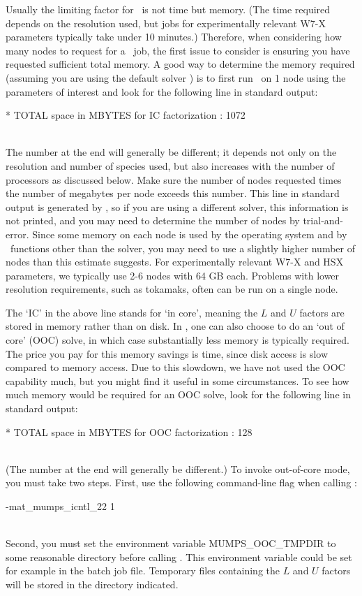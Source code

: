 Usually the limiting factor for \sfincs~is not time but memory.
(The time required depends on the resolution used, but jobs for experimentally relevant W7-X parameters
typically take under 10 minutes.)
Therefore, when considering how many nodes to request for a \sfincs~job,
the first issue to consider is ensuring you have requested sufficient total memory.
A good way to determine the memory required (assuming you are using the default solver \mumps)
is to first run \sfincs~on 1 node using the parameters of interest
and look for the following line in standard output:\\
\centerline{\ttfamily ** TOTAL     space in MBYTES for IC factorization         :       1072}\\
The number at the end will generally be different; it depends not only on the
resolution and number of species used, but also increases with the number of processors
as discussed below.  Make sure the number of nodes requested times the number of megabytes per node exceeds this number.
This line in standard output is generated by \mumps, so if you are using a different solver, this information is not printed,
and you may need to determine the number of nodes by trial-and-error.
Since some memory on each node is used by the operating system and by \sfincs~functions other than the solver,
you may need to use a slightly higher number of nodes than this estimate suggests.
For experimentally relevant W7-X and HSX parameters, we typically use 2-6 nodes with 64 GB each.
Problems with lower resolution requirements, such as tokamaks, often can be run on a single node.

The `IC' in the above line stands for `in core', meaning the $L$ and $U$ factors are stored
in memory rather than on disk.  In \mumps, one can also choose to do an `out of core' (OOC) solve,
in which case substantially less memory is typically required.  The price you pay for this memory savings is time, since
disk access is slow compared to memory access.  Due to this slowdown, we have not used the OOC capability much, but
you might find it useful in some circumstances.
To see how much memory would be required for an OOC solve,
look for the following line in standard output:\\
\centerline{\ttfamily ** TOTAL     space in MBYTES for OOC factorization        :       128}\\
(The number at the end will generally be different.)
To invoke out-of-core mode, you must take two steps. First, use the following command-line flag when calling \sfincs:\\
\centerline{\ttfamily -mat\_mumps\_icntl\_22 1}\\
Second, you must set the environment variable {\ttfamily MUMPS\_OOC\_TMPDIR} to some reasonable directory
before calling \sfincs. This environment variable could be set for example in the batch job file.
Temporary files containing the $L$ and $U$ factors will be stored in the directory indicated.

